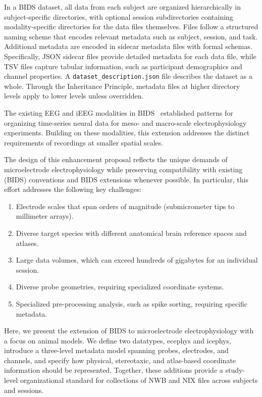 \documentclass[fleqn,10pt]{article}
\begin{document}
In a BIDS dataset, all data from each subject are organized hierarchically in subject-specific directories, with optional session subdirectories containing modality-specific directories for the data files themselves.
Files follow a structured naming scheme that encodes relevant metadata such as subject, session, and task.
Additional metadata are encoded in sidecar metadata files with formal schemas. Specifically, JSON sidecar files provide detailed metadata for each data file, while TSV files capture tabular information, such as participant demographics and channel properties.
A \texttt{dataset\_description.json} file describes the dataset as a whole. 
Through the Inheritance Principle, metadata files at higher directory levels apply to lower levels unless overridden.

The existing EEG and iEEG modalities in BIDS~\citep{pernet_eeg-bids_2019, holdgraf_ieeg-bids_2019} established patterns for organizing time-series neural data for meso- and macro-scale electrophysiology experiments. Building on these modalities, this extension addresses the distinct requirements of recordings at smaller spatial scales.

The design of this enhancement proposal reflects the unique demands of microelectrode electrophysiology while preserving compatibility with existing (BIDS) conventions and BIDS extensions whenever possible. In particular, this effort addresses the following key challenges:
\begin{enumerate}[noitemsep]
	\item Electrode scales that span orders of magnitude (submicrometer tips to millimeter arrays).
	\item Diverse target species with different anatomical brain reference spaces and atlases.
	\item Large data volumes, which can exceed hundreds of gigabytes for an individual session.
	\item Diverse probe geometries, requiring specialized coordinate systems.
	\item Specialized pre-processing analysis, such as spike sorting, requiring specific metadata.
\end{enumerate}

Here, we present the extension of BIDS to microelectrode electrophysiology with a focus on animal models.
We define two datatypes, ecephys and icephys, introduce a three-level metadata model spanning probes, electrodes, and channels, and specify how physical, stereotaxic, and atlas-based coordinate information should be represented. Together, these additions provide a study-level organizational standard for collections of NWB and NIX files across subjects and sessions.
\end{document}
